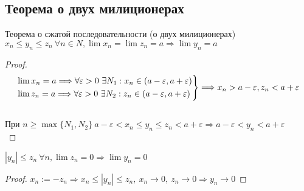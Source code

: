 \subsection{Теорема о двух милиционерах}
    
    
    \begin{theorem-non}
        Теорема о сжатой последовательности (о двух милиционерах) \\
        $x_n \leqslant y_n \leqslant z_n\ \forall n\in N, \lim x_n = \lim z_n = a \Longrightarrow \lim y_n = a$
    \end{theorem-non}
    \begin{proof}
        \[
    \begin{drcases}
    \lim x_n = a \Longrightarrow \forall \varepsilon>0\ \exists N_1: x_n\in (a-\varepsilon, a+\varepsilon)\\
    \lim z_n = a \Longrightarrow \forall \varepsilon>0\  \exists N_2: z_n\in (a-\varepsilon, a+\varepsilon)
    \end{drcases}
    \Longrightarrow x_n > a-\varepsilon, z_n<a+\varepsilon 
    \] \\
    При $n\geqslant \max\{N_1, N_2\}\ a-\varepsilon<x_n\leqslant y_n \leqslant z_n<a+\varepsilon \Longrightarrow a-\varepsilon<y_n<a+\varepsilon$\\
    \end{proof}
    
    \follow \; $|y_n|\leqslant z_n\ \forall n, \lim z_n = 0 \Longrightarrow \lim y_n = 0$
    
    \begin{proof}
        $x_n:=-z_n \Longrightarrow x_n \leqslant |y_n| \leqslant z_n,\ x_n \to 0,\ z_n \to 0 \Longrightarrow y_n \to 0$
    \end{proof}